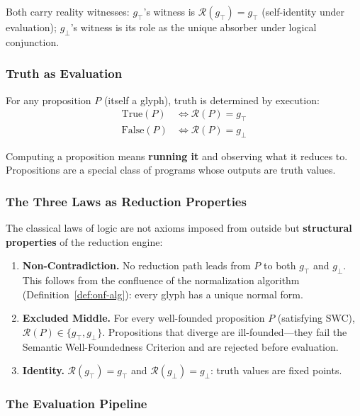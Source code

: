 \documentclass[12pt, letterpaper]{book}
\def\mathfrak#1{#1}%
\begin{document}
Both carry reality witnesses: $\mathfrak{g}_\top$'s witness is $\mathcal{R}(\mathfrak{g}_\top) = \mathfrak{g}_\top$ (self-identity under evaluation); $\mathfrak{g}_\bot$'s witness is its role as the unique absorber under logical conjunction.

\subsubsection{Truth as Evaluation}

For any proposition $P$ (itself a glyph), truth is determined by execution:
\begin{align*}
\mathrm{True}(P) &\iff \mathcal{R}(P) = \mathfrak{g}_\top \\
\mathrm{False}(P) &\iff \mathcal{R}(P) = \mathfrak{g}_\bot
\end{align*}

Computing a proposition means \textbf{running it} and observing what it reduces to. Propositions are a special class of programs whose outputs are truth values.

\subsubsection{The Three Laws as Reduction Properties}

The classical laws of logic are not axioms imposed from outside but \textbf{structural properties} of the reduction engine:

\begin{enumerate}[label=(\roman*)]
    \item \textbf{Non-Contradiction.} No reduction path leads from $P$ to both $\mathfrak{g}_\top$ and $\mathfrak{g}_\bot$. This follows from the confluence of the normalization algorithm (Definition~\ref{def:onf-alg}): every glyph has a unique normal form.
    \item \textbf{Excluded Middle.} For every well-founded proposition $P$ (satisfying SWC), $\mathcal{R}(P) \in \{\mathfrak{g}_\top, \mathfrak{g}_\bot\}$. Propositions that diverge are ill-founded---they fail the Semantic Well-Foundedness Criterion and are rejected before evaluation.
    \item \textbf{Identity.} $\mathcal{R}(\mathfrak{g}_\top) = \mathfrak{g}_\top$ and $\mathcal{R}(\mathfrak{g}_\bot) = \mathfrak{g}_\bot$: truth values are fixed points.
\end{enumerate}

\subsubsection{The Evaluation Pipeline}
\end{document}
